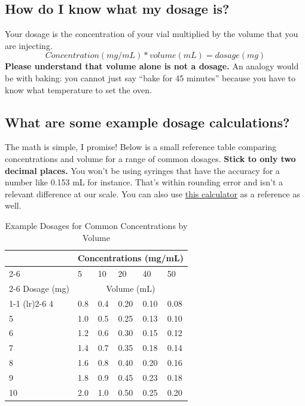 \documentclass{article}
\begin{document}
\subsection{How do I know what my dosage is?}

Your dosage is the concentration of your vial multiplied by the volume that you are injecting. \[Concentration (mg/mL) * volume (mL) = dosage (mg)\] \textbf{Please understand that volume alone is not a dosage.} An analogy would be with baking: you cannot just say “bake for 45 minutes” because you have to know what temperature to set the oven.

\subsection{What are some example dosage calculations?}

The math is simple, I promise! Below is a small reference table comparing concentrations and volume for a range of common dosages. \textbf{Stick to only two decimal places.} You won’t be using syringes that have the accuracy for a number like 0.153 mL for instance. That’s within rounding error and isn’t a relevant difference at our scale. You can also use \href{https://web.archive.org/web/20260307075103/https://hrtcafe.net/Calc/}{this calculator} as a reference as well.

\begin{table}
\centering
\caption{Example Dosages for Common Concentrations by Volume}
\label{tab:concentrations}
\begin{tabular}{@{}llllll@{}}
  \toprule
  \multicolumn{1}{c}{} & \multicolumn{5}{c}{Concentrations (mg/mL)} \\
  \cmidrule(rl){2-6}
            & 5    & 10  & 20 & 40 & 50   \\
            \cmidrule(rl){2-6}
Dosage (mg) & \multicolumn{5}{c}{Volume (mL)}  \\
    \cmidrule(r){1-1} \cmidrule(lr){2-6}
4        & 0.8  & 0.4 & 0.20  & 0.10 & 0.08\\
5        & 1.0    & 0.5 & 0.25 & 0.13 &  0.10\\
6        & 1.2  & 0.6   & 0.30  & 0.15 & 0.12   \\
7        & 1.4  & 0.7 & 0.35  & 0.18 & 0.14\\
8        & 1.6  & 0.8   & 0.40  & 0.20 & 0.16  \\
9        & 1.8  & 0.9 & 0.45  & 0.23 & 0.18\\
10       & 2.0    & 1.0   & 0.50  & 0.25 & 0.20 \\
  \bottomrule
\end{tabular}
\end{table}
\end{document}
